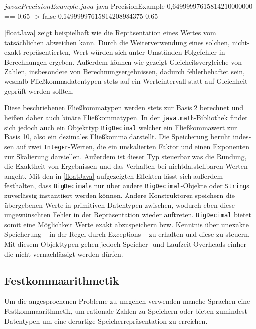 \sepCodeAndOutputCheck
\begin{shellwindow}
$ javac PrecisionExample.java 
$ java PrecisionExample
0,64999997615814210000000 == 0.65 -> false
0.64999997615814208984375
0.65
\end{shellwindow}

\autoref{floatJava} zeigt beispielhaft wie die Repräsentation eines Wertes vom tatsächlichen abweichen kann. Durch die Weiterverwendung eines solchen, nicht-exakt repräsentierten, Wert würden sich unter Umständen Folgefehler in Berechnungen ergeben. Außerdem können wie gezeigt Gleicheitsvergleiche von Zahlen, insbesondere von Berechnungsergebnissen, dadurch fehlerbehaftet sein, weshalb Fließkommadatentypen stets auf ein Werteintervall statt auf Gleichheit geprüft werden sollten.

Diese beschriebenen Fließkommatypen werden stets zur Basis 2 berechnet und heißen daher auch binäre Fließkommatypen. In der \texttt{java.math}-Bibliothek findet sich jedoch auch ein Objekttyp \texttt{BigDecimal} welcher ein Fließkommawert zur Basis 10, also ein dezimales Fließkomma darstellt. Die Speicherung beruht in­des­sen auf zwei \texttt{Integer}-Werten, die ein unskalierten Faktor und einen Exponenten zur Skalierung darstellen. Außerdem ist dieser Typ steuerbar was die Rundung, die Exaktheit von Ergebnissen und das Verhalten bei nichtdarstellbaren Werten angeht. Mit den in \autoref{floatJava} aufgezeigten Effekten lässt sich außerdem festhalten, dass \texttt{BigDecimal}s nur über andere \texttt{BigDecimal}-Objekte oder \texttt{String}s zuverlässig instantiiert werden können. Andere Konstruktoren speichern die übergebenen Werte in primitiven Datentypen zwischen, wodurch eben diese ungewünschten Fehler in der Repräsentation wieder auftreten. \texttt{BigDecimal} bietet somit eine Möglichkeit Werte exakt abzuspeichern bzw. Kenntnis über unexakte Speicherung -- in der Regel durch Exceptions -- zu erhalten und diese zu steuern. Mit diesem Objekttypen gehen jedoch Speicher- und Laufzeit-Overheads einher die nicht vernachlässigt werden dürfen.

\subsection*{Festkommaarithmetik}
Um die angesprochenen Probleme zu umgehen verwenden manche Sprachen eine Festkommaarithmetik, um rationale Zahlen zu Speichern oder bieten zumindest Datentypen um eine derartige Speicherrepräsentation zu erreichen. 

